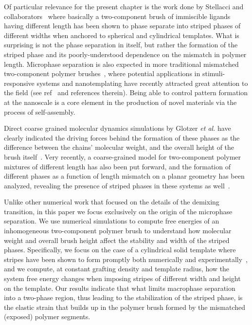 Of particular relevance for the present chapter is the work done by Stellacci and 
collaborators~\cite{Stellacci1,Stellacci2,Stellacci3,Stellacci4,Stellacci5} where basically a two-component 
brush of immiscible ligands having different length has been shown to phase separate into striped phases of different widths  when anchored to spherical and cylindrical templates. What is surprising is not the phase separation in itself, but rather the formation of the striped phase and its poorly-understood dependence on the mismatch in polymer length.
{ Microphase separation is also expected in more traditional  mismatched two-component polymer brushes~\cite{katz}, where potential applications in stimuli-responsive systems and nanotemplating have recently attracted great attention 
to the field (see ref~\cite{ayres} and references therein).}
Being able to control pattern formation at the nanoscale is a core element in the production 
of novel materials via the process of self-assembly. 

Direct coarse grained molecular dynamics simulations by Glotzer \textit{et al.} have clearly indicated  
the driving forces behind the formation of these phases as the difference between the chains' molecular weight, and the overall 
height of the brush itself~\cite{Stellacci2,Stellacci4,Stellacci5,Glz1,Stellacci6}.
{ Very recently, a coarse-grained model for two-component polymer mixtures of different length has also been put forward, and 
the formation of different phases as a function of length mismatch on a planar geometry has been analyzed, revealing the 
presence of striped phases in these systems as well~\cite{katz}}.
 
Unlike other numerical work that focused on the details of the demixing transition,   
in this paper { we focus exclusively on the origin of the microphase separation}.
We use numerical simulations to compute free energies of an  
inhomogeneous two-component polymer brush to understand how molecular weight and overall brush  height
affect the stability and width of the striped phases. 
Specifically, we focus on the case of a cylindrical solid template where stripes have been shown to form
promptly both numerically and experimentally~\cite{Stellacci6,Stellacci5}, and we compute, at constant grafting density  
and template radius, how the system free energy changes when imposing stripes of different width and height on the template.
{ Our results indicate that what limits macrophase separation into a two-phase region, thus leading to the stabilization of the striped phase, is 
the elastic strain that  builds up in the polymer brush formed by the mismatched (exposed) polymer segments.}

